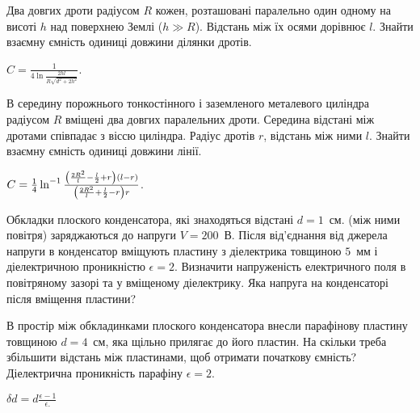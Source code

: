 \begin{problem}%
Два довгих дроти радіусом $R$ кожен, розташовані паралельно один одному на висоті $h$ над поверхнею Землі ($h \gg R$). Відстань між їх осями дорівнює $l$. Знайти взаємну ємність одиниці довжини ділянки дротів.
\begin{solution}
	$C = \frac{1}{4\ln\frac{2hl}{R\sqrt{d^2 + 2h^2}}}$.
\end{solution}
\end{problem}

\begin{problem}
В середину порожнього тонкостінного і заземленого металевого циліндра радіусом $R$ вміщені два довгих паралельних дроти. Середина відстані між дротами співпадає з віссю циліндра. Радіус дротів $r$, відстань між ними $l$. Знайти взаємну ємність одиниці довжини лінії.
\begin{solution}
	$C = \frac14\ln^{-1}%
		\frac{%
			\left( \frac{2R^2}{l} - \frac{l}{2} + r \right)(l - r)
		}%
		{\left( \frac{2R^2}{l} + \frac{l}{2} - r \right)r }$.
\end{solution}
\end{problem}


\begin{problem}
	Обкладки плоского конденсатора, які знаходяться відстані $d = 1$~см. (між ними повітря) заряджаються до напруги $V = 200$~В. Після від'єднання від джерела напруги в конденсатор вміщують пластину з діелектрика товщиною $5$~мм і
	діелектричною проникністю $\epsilon = 2$. Визначити напруженість електричного поля в повітряному зазорі та у вміщеному діелектрику. Яка напруга на конденсаторі після вміщення пластини?
\end{problem}

\begin{problem}%
    В простір між обкладинками плоского конденсатора внесли парафінову пластину товщиною $ d = 4 $~см, яка щільно прилягає до його пластин. На скільки треба збільшити відстань між пластинами, щоб отримати початкову ємність? Діелектрична проникність парафіну $\epsilon = 2$.
\begin{solution}
    $\delta d = d \frac{\epsilon - 1}{\epsilon.}$
\end{solution}
\end{problem}



